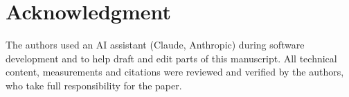 \documentclass[conference]{IEEEtran}
\begin{document}
\section*{Acknowledgment}
The authors used an AI assistant (Claude, Anthropic) during software development and to help draft and edit parts of this manuscript. All technical content, measurements and citations were reviewed and verified by the authors, who take full responsibility for the paper.



\end{document}
